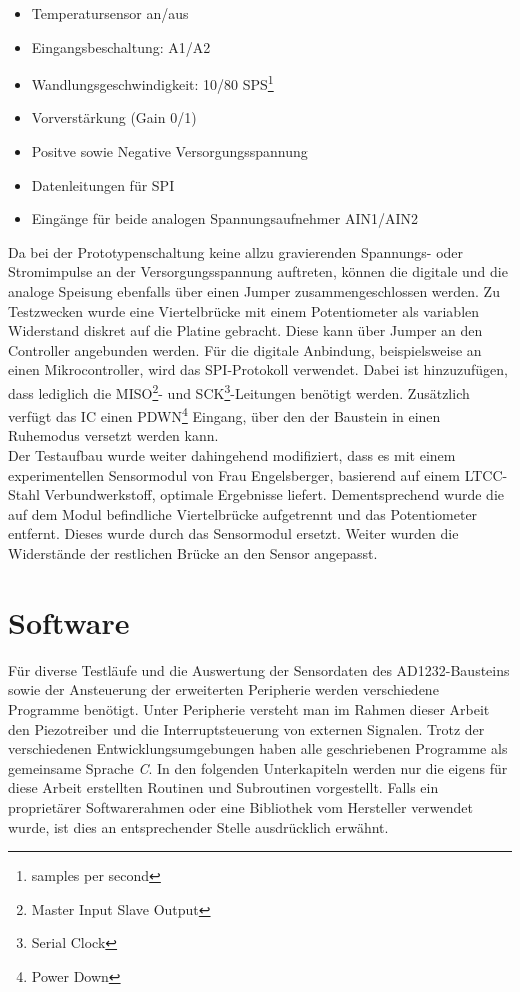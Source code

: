 \documentclass[12pt]{scrreprt} %
\begin{document}
\begin{itemize}
\item
Temperatursensor an/aus
\item
Eingangsbeschaltung: A1/A2
\item
Wandlungsgeschwindigkeit: 10/80 SPS\footnote{samples per second}
\item
Vorverstärkung (Gain 0/1)
\item
Positve sowie Negative Versorgungsspannung
\item
Datenleitungen für SPI
\item
Eingänge für beide analogen Spannungsaufnehmer AIN1/AIN2
\end{itemize}
Da bei der Prototypenschaltung keine allzu gravierenden Spannungs- oder Stromimpulse an der Versorgungsspannung auftreten, können die digitale und die analoge Speisung ebenfalls über einen Jumper zusammengeschlossen werden. Zu Testzwecken wurde eine Viertelbrücke mit einem Potentiometer als variablen Widerstand diskret auf die Platine gebracht. Diese kann über Jumper an den Controller angebunden werden. Für die digitale Anbindung, beispielsweise an einen Mikrocontroller, wird das SPI-Protokoll verwendet. Dabei ist hinzuzufügen, dass lediglich die MISO\footnote{Master Input Slave Output}- und SCK\footnote{Serial Clock}-Leitungen benötigt werden. Zusätzlich verfügt das IC einen PDWN\footnote{Power Down} Eingang, über den der Baustein in einen Ruhemodus versetzt werden kann.\\
Der Testaufbau wurde weiter dahingehend modifiziert, dass es mit einem experimentellen Sensormodul von Frau Engelsberger, basierend auf einem LTCC-Stahl Verbundwerkstoff, optimale Ergebnisse liefert. Dementsprechend wurde die auf dem Modul befindliche Viertelbrücke aufgetrennt und das Potentiometer entfernt. Dieses wurde durch das Sensormodul ersetzt. Weiter wurden die Widerstände der restlichen Brücke an den Sensor angepasst.
\chapter{Software}
\label{Software}
Für diverse Testläufe und die Auswertung der Sensordaten des AD1232-Bausteins sowie der Ansteuerung der erweiterten Peripherie werden verschiedene Programme benötigt. Unter Peripherie versteht man im Rahmen dieser Arbeit den Piezotreiber und die Interruptsteuerung von externen Signalen. Trotz der verschiedenen Entwicklungsumgebungen haben alle geschriebenen Programme als gemeinsame Sprache \textit{C}. In den folgenden Unterkapiteln werden nur die eigens für diese Arbeit erstellten Routinen und Subroutinen vorgestellt. Falls ein proprietärer Softwarerahmen oder eine Bibliothek vom Hersteller verwendet wurde, ist dies an entsprechender Stelle ausdrücklich erwähnt.
\end{document}
